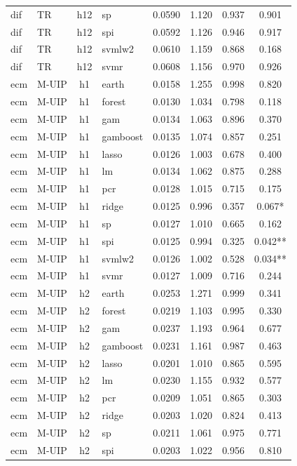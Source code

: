 \begin{ThreePartTable}
\begin{longtable}[t]{llclcccc}
dif & TR & h12 & sp & 0.0590 & 1.120 & 0.937 & 0.901\\
dif & TR & h12 & spi & 0.0592 & 1.126 & 0.946 & 0.917\\
dif & TR & h12 & svmlw2 & 0.0610 & 1.159 & 0.868 & 0.168\\
dif & TR & h12 & svmr & 0.0608 & 1.156 & 0.970 & 0.926\\
\addlinespace
ecm & M-UIP & h1 & earth & 0.0158 & 1.255 & 0.998 & 0.820\\
ecm & M-UIP & h1 & forest & 0.0130 & 1.034 & 0.798 & 0.118\\
ecm & M-UIP & h1 & gam & 0.0134 & 1.063 & 0.896 & 0.370\\
ecm & M-UIP & h1 & gamboost & 0.0135 & 1.074 & 0.857 & 0.251\\
ecm & M-UIP & h1 & lasso & 0.0126 & 1.003 & 0.678 & 0.400\\
ecm & M-UIP & h1 & lm & 0.0134 & 1.062 & 0.875 & 0.288\\
ecm & M-UIP & h1 & pcr & 0.0128 & 1.015 & 0.715 & 0.175\\
ecm & M-UIP & h1 & ridge & 0.0125 & 0.996 & 0.357 & 0.067*\\
ecm & M-UIP & h1 & sp & 0.0127 & 1.010 & 0.665 & 0.162\\
ecm & M-UIP & h1 & spi & 0.0125 & 0.994 & 0.325 & 0.042**\\
ecm & M-UIP & h1 & svmlw2 & 0.0126 & 1.002 & 0.528 & 0.034**\\
ecm & M-UIP & h1 & svmr & 0.0127 & 1.009 & 0.716 & 0.244\\
\addlinespace
ecm & M-UIP & h2 & earth & 0.0253 & 1.271 & 0.999 & 0.341\\
ecm & M-UIP & h2 & forest & 0.0219 & 1.103 & 0.995 & 0.330\\
ecm & M-UIP & h2 & gam & 0.0237 & 1.193 & 0.964 & 0.677\\
ecm & M-UIP & h2 & gamboost & 0.0231 & 1.161 & 0.987 & 0.463\\
ecm & M-UIP & h2 & lasso & 0.0201 & 1.010 & 0.865 & 0.595\\
ecm & M-UIP & h2 & lm & 0.0230 & 1.155 & 0.932 & 0.577\\
ecm & M-UIP & h2 & pcr & 0.0209 & 1.051 & 0.865 & 0.303\\
ecm & M-UIP & h2 & ridge & 0.0203 & 1.020 & 0.824 & 0.413\\
ecm & M-UIP & h2 & sp & 0.0211 & 1.061 & 0.975 & 0.771\\
ecm & M-UIP & h2 & spi & 0.0203 & 1.022 & 0.956 & 0.810\\

\end{longtable}
\end{ThreePartTable}

